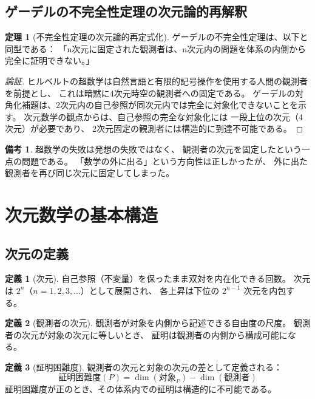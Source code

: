 \documentclass[11pt,a4paper]{article}
\theoremstyle{definition}
\newtheorem{definition}{定義}[section]
\newtheorem{theorem}{定理}[section]
\newtheorem{remark}{備考}[section]
\begin{document}
\subsection{ゲーデルの不完全性定理の次元論的再解釈}

\begin{theorem}[不完全性定理の次元論的再定式化]
ゲーデルの不完全性定理は、以下と同型である：
「n次元に固定された観測者は、n次元内の問題を体系の内側から完全に証明できない。」
\end{theorem}

\begin{proof}[論証]
ヒルベルトの超数学は自然言語と有限的記号操作を使用する人間の観測者を前提とし、
これは暗黙に4次元時空の観測者への固定である。
ゲーデルの対角化補題は、2次元内の自己参照が同次元内では完全に対象化できないことを示す。
次元数学の観点からは、自己参照の完全な対象化には
一段上位の次元（4次元）が必要であり、
2次元固定の観測者には構造的に到達不可能である。
\end{proof}

\begin{remark}
超数学の失敗は発想の失敗ではなく、
観測者の次元を固定したという一点の問題である。
「数学の外に出る」という方向性は正しかったが、
外に出た観測者を再び同じ次元に固定してしまった。
\end{remark}

\section{次元数学の基本構造}

\subsection{次元の定義}

\begin{definition}[次元]
自己参照（不変量）を保ったまま双対を内在化できる回数。
次元は $2^n$（$n = 1, 2, 3, \ldots$）として展開され、
各上昇は下位の $2^{n-1}$ 次元を内包する。
\end{definition}

\begin{definition}[観測者の次元]
観測者が対象を内側から記述できる自由度の尺度。
観測者の次元が対象の次元に等しいとき、
証明は観測者の内側から構成可能になる。
\end{definition}

\begin{definition}[証明困難度]
観測者の次元と対象の次元の差として定義される：
\[
\text{証明困難度}(P) = \dim(\text{対象}_P) - \dim(\text{観測者})
\]
証明困難度が正のとき、その体系内での証明は構造的に不可能である。
\end{definition}
\end{document}
